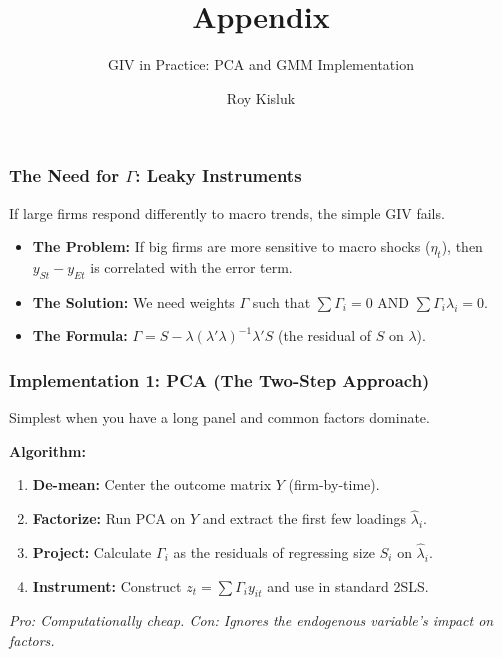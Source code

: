 \documentclass[aspectratio=169,11pt]{beamer}
\begin{document}
\begin{frame}
    \title{Appendix}
    \subtitle{GIV in Practice: PCA and GMM Implementation}
    \author{Roy Kisluk}
    \date{}
    \titlepage
\end{frame}

\begin{frame}
    \frametitle{The Need for $\Gamma$: Leaky Instruments}
    
    \vspace{0.5cm}
    {\Large
        If large firms respond differently to macro trends, the simple GIV fails.
    }
    
    \vspace{1cm}
    \begin{itemize}
        \item \textbf{The Problem:} If big firms are more sensitive to macro shocks ($\eta_t$), then $y_{St} - y_{Et}$ is correlated with the error term.
        \item \textbf{The Solution:} We need weights $\Gamma$ such that $\sum \Gamma_i = 0$ AND $\sum \Gamma_i \lambda_i = 0$.
        \item \textbf{The Formula:} $\Gamma = S - \lambda (\lambda' \lambda)^{-1} \lambda' S$ (the residual of $S$ on $\lambda$).
    \end{itemize}
\end{frame}

\begin{frame}
    \frametitle{Implementation 1: PCA (The Two-Step Approach)}
    
    {\large
        Simplest when you have a long panel and common factors dominate.
    }
    
    \vspace{0.5cm}
    \textbf{Algorithm:}
    \begin{enumerate}
        \item \textbf{De-mean:} Center the outcome matrix $Y$ (firm-by-time).
        \item \textbf{Factorize:} Run PCA on $Y$ and extract the first few loadings $\hat{\lambda}_i$.
        \item \textbf{Project:} Calculate $\Gamma_i$ as the residuals of regressing size $S_i$ on $\hat{\lambda}_i$.
        \item \textbf{Instrument:} Construct $z_t = \sum \Gamma_i y_{it}$ and use in standard 2SLS.
    \end{enumerate}
    
    \vspace{0.5cm}
    \textit{Pro: Computationally cheap. Con: Ignores the endogenous variable's impact on factors.}
\end{frame}
\end{document}
